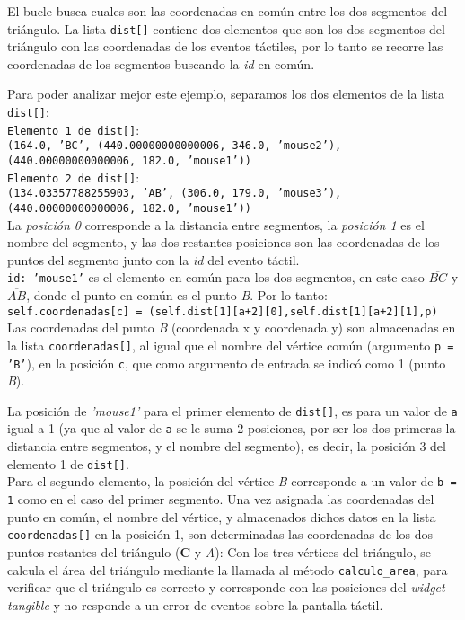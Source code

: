 El bucle busca cuales son las coordenadas en común entre los dos segmentos del triángulo. La lista \texttt{dist[]} contiene dos elementos que son los dos segmentos del triángulo con las coordenadas de los eventos táctiles, por lo tanto se recorre las coordenadas de los segmentos buscando la \textit{id} en común. 

Para poder analizar mejor este ejemplo, separamos los dos elementos de la lista \texttt{dist[]}:\\

\texttt{Elemento 1 de dist[]}:\\
\texttt{(164.0, 'BC', (440.00000000000006, 346.0, 'mouse2'), (440.00000000000006, 182.0, 'mouse1'))}\\

\texttt{Elemento 2 de dist[]}:\\
\texttt{(134.03357788255903, 'AB', (306.0, 179.0, 'mouse3'), (440.00000000000006, 182.0, 'mouse1'))}\\

La \textit{posición 0} corresponde a la distancia entre segmentos, la \textit{posición 1} es el nombre del segmento, y las dos restantes posiciones son las coordenadas de los puntos del segmento junto con la \textit{id} del evento táctil.\\

\texttt{id: 'mouse1'} es el elemento en común para los dos segmentos, en este caso $\overline{BC}$ y $\overline{AB}$, donde el punto en común es el punto \textit{B}. Por lo tanto:\\

\texttt{self.coordenadas[c] = (self.dist[1][a+2][0],self.dist[1][a+2][1],p)}\\

Las coordenadas del punto \textit{B} (coordenada x y coordenada y) son almacenadas en la lista \texttt{coordenadas[]}, al igual que el nombre del vértice común (argumento \texttt{p = 'B'}), en la posición \texttt{c}, que como argumento de entrada se indicó como 1 (punto \textit{B}). 

La posición de \textit{'mouse1'} para el primer elemento de \texttt{dist[]}, es para un valor de \texttt{a} igual a 1 (ya que al valor de \texttt{a} se le suma 2 posiciones, por ser los dos primeras la distancia entre segmentos, y el nombre del segmento), es decir, la posición 3 del elemento 1 de \texttt{dist[]}.\\

Para el segundo elemento, la posición del vértice \textit{B} corresponde a un valor de \texttt{b = 1} como en el caso del primer segmento.
Una vez asignada las coordenadas del punto en común, el nombre del vértice, y almacenados dichos datos en la lista \texttt{coordenadas[]} en la posición 1, son determinadas las coordenadas de los dos puntos restantes del triángulo (\textbf{C} y \textit{A}): 
Con los tres vértices del triángulo, se calcula el área del triángulo mediante la llamada al método \texttt{calculo\_area}, para verificar que el triángulo es correcto y corresponde con las posiciones del \emph{widget tangible} y no responde a un error de eventos sobre la pantalla táctil.\\

